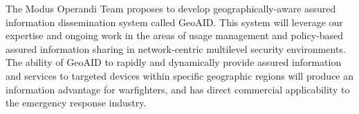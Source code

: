 \documentclass{sbir}
\begin{document}
\listoffixmes
\newpage
 
\tableofcontents
\newpage
 
 
{The Modus Operandi Team proposes to develop geographically-aware assured information dissemination system called GeoAID. This system will leverage our expertise and ongoing work in the areas of usage management and policy-based assured information sharing in network-centric multilevel security environments. The ability of GeoAID to rapidly and dynamically provide assured information and services to targeted devices within specific geographic regions will produce an information advantage for warfighters, and has direct commercial applicability to the emergency response industry.}
 
\end{document}
